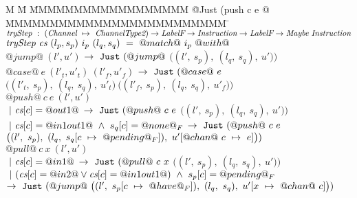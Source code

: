 

\newcommand\nextStep[5]{\big((#1,~#2),~(#3,~#4),~#5 \big)}


\begin{figure*}
\begin{tabbing}
M \= M \= MMMMMMMMMMMMMMMMMM \= @Just (push c e @ \= MMMMMMMMMMMMMMMMMMMMMMMMM \= \kill
$\textit{tryStep} ~:~ (\textit{Channel} ~\mapsto~ \textit{ChannelType2}) \to \textit{LabelF} \to \textit{Instruction} \to \textit{LabelF} \to \textit{Maybe}~\textit{Instruction}$ \\
$\textit{tryStep} ~\textit{cs}~(l_p,s_p)~i_p~(l_q,s_q)~=~@match@~i_p~@with@$ \\

\> $@jump@~(l',u')$ 
\> \> $\to~\texttt{Just}~ (@jump@$ \> $
      \nextStep
        {l'}{s_p}
        {l_q}{s_q}
        {u'})
      $ 
\> 
\\[1ex]

\> $@case@~e~(l'_t,u'_t)~(l'_f,u'_f)$
\> \> $\to~\texttt{Just}~ (@case@~e$ \> $
      \nextStep
        {l'_t}{s_p}
        {l_q}{s_q}
        {u'_t}
      ~
      \nextStep
        {l'_f}{s_p}
        {l_q}{s_q}
        {u'_f})
      $ 
\> 
\\[1ex]

\> $@push@~c~e~(l',u')$ \\
\> \> $~|~\textit{cs}[c]=@out1@$ 
\> $\to~\texttt{Just}~ (@push@~c~e$ \> $
      \nextStep
        {l'}
          {s_p}
        {l_q}
          {s_q}
        {u'})
      $ 
\> \\

\> \> $~|~\textit{cs}[c]=@in1out1@ ~\wedge~ s_q[c]=@none@_F$ 
\> $\to~\texttt{Just}~ (@push@~c~e$ \> $
      \nextStep
        {l'}
          {s_p}
        {l_q}
          {\HeapUpdateOne{c}{@pending@_F}{s_q}}
        {\HeapUpdateOne{@chan@~c}{e}{u'}})
      $
\> 
\\[1ex]


\> $@pull@~c~x~(l',u')$ \\
\> \> $~|~\textit{cs}[c]=@in1@$ 
\> $\to~\texttt{Just}~ (@pull@~c~x$ \> $
      \nextStep
        {l'}{s_p}
        {l_q}{s_q}
        {u'})
    $ 
\> 
\\[1ex]

\> \> $~|~(\textit{cs}[c]=@in2@ \vee \textit{cs}[c]=@in1out1@) ~\wedge~ s_p[c]=@pending@_F$ \\
\> \> $\to~\Just (@jump@~
      \nextStep
        {l'}
          {\HeapUpdateOne{c}{@have@_F}{s_p}}
        {l_q}
          {s_q}
        {\HeapUpdateOne{x}{@chan@~c}{u'}})
        $ 
\> \> \>  
\\[1ex]


\end{tabbing}
\end{figure*}
